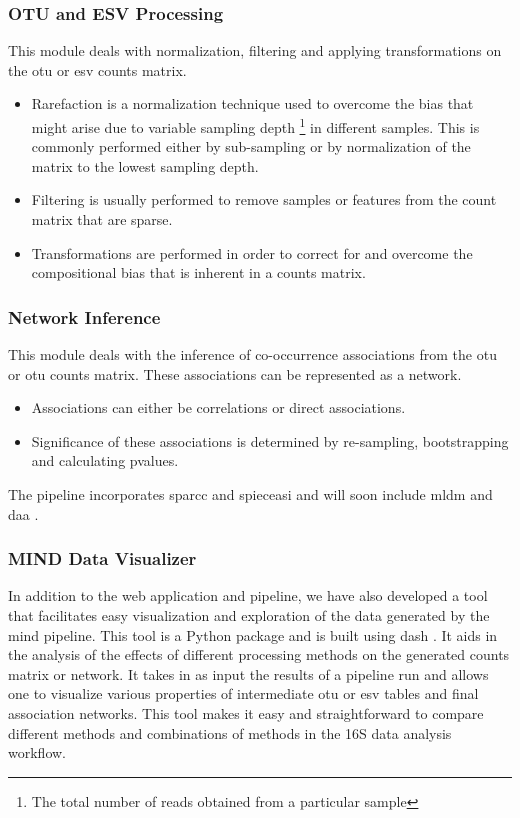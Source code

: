   \subsubsection*{OTU and ESV Processing}
    \vspace{-5mm}
    This module deals with normalization, filtering and applying transformations on the \ac{otu} or \ac{esv} counts matrix.
    \begin{itemize}
    \item Rarefaction is a normalization technique used to overcome the bias that might arise due to variable sampling depth \footnote{The total number of reads obtained from a particular sample} in different samples. This is commonly performed either by sub-sampling or by normalization of the matrix to the lowest sampling depth.
    \item Filtering is usually performed to remove samples or features from the count matrix that are sparse.
    \item Transformations are performed in order to correct for and overcome the compositional bias that is inherent in a counts matrix.
    \end{itemize}

  \subsubsection*{Network Inference}
    \vspace{-5mm}
    This module deals with the inference of co-occurrence associations from the \ac{otu} or \ac{otu} counts matrix. These associations can be represented as a network.
    \begin{itemize}
    \item Associations can either be correlations or direct associations.
    \item Significance of these associations is determined by re-sampling, bootstrapping and calculating pvalues.
    \end{itemize}
    The pipeline incorporates \ac{sparcc} \cite{Friedman2012} and \ac{spieceasi} \cite{Kurtz2015} and will soon include \ac{mldm} \cite{Yang2017} and \ac{daa} \cite{Menon2018}.

  \subsubsection*{MIND Data Visualizer}

    In addition to the web application and pipeline, we have also developed a tool that facilitates easy visualization and exploration of the data generated by the \ac{mind} pipeline.
    This tool is a Python package and is built using dash \cite{dash}.
    It aids in the analysis of the effects of different processing methods on the generated counts matrix or network.
    It takes in as input the results of a pipeline run and allows one to visualize various properties of intermediate \ac{otu} or \ac{esv} tables and final association networks.
    This tool makes it easy and straightforward to compare different methods and combinations of methods in the 16S data analysis workflow.

